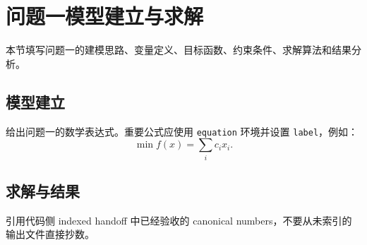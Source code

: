 \section{问题一模型建立与求解}
\label{sec:model-1}

本节填写问题一的建模思路、变量定义、目标函数、约束条件、求解算法和结果分析。

\subsection{模型建立}

给出问题一的数学表达式。重要公式应使用 \texttt{equation} 环境并设置 \texttt{label}，例如：
\begin{equation}
  \min f(x)=\sum_i c_i x_i .
  \label{eq:model-1-objective}
\end{equation}

\subsection{求解与结果}

引用代码侧 indexed handoff 中已经验收的 canonical numbers，不要从未索引的输出文件直接抄数。
